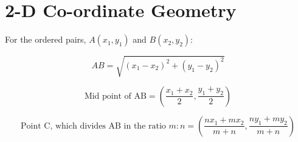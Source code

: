 \chapter{2-D Co-ordinate Geometry}
For the ordered pairs, $A(x_1,y_1)$ and $B(x_2,y_2)$:

\begin{equation}
	AB = \sqrt{(x_1-x_2)^2+(y_1-y_2)^2}
\end{equation}

\begin{equation}
	\text{Mid point of AB} = (\dfrac{x_1+x_2}{2},\dfrac{y_1+y_2}{2})
\end{equation}

\begin{equation}
	\text{Point C, which divides AB in the ratio }m:n = (\dfrac{nx_1+mx_2}{m+n},\dfrac{ny_1+my_2}{m+n})
\end{equation}
